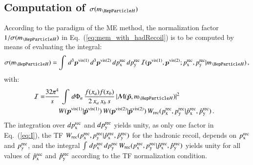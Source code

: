 \subsection{Computation of $\sigma(m_{\PHiggs})$}
\label{sec:mem_xSection}

According to the paradigm of the ME method, the normalization factor
$1/\sigma(m_{\PHiggs})$ in Eq.~(\ref{eq:mem_with_hadRecoil}) is to be computed
by means of evaluating the integral:
\begin{equation}
\sigma(m_{\PHiggs}) =
\int \, d^{3}\bm{p}^{\vis(1)} \, d^{3}\bm{p}^{\vis(2)} \,
d\pX^{\rec} \, d\pY^{\rec} \, \mathcal{I}(\bm{p}^{\vis(1)},\bm{p}^{\vis(2)};\pX^{\rec},\pY^{\rec}|m_{\PHiggs}) \, ,
\label{eq:xSection}
\end{equation}
with:
\begin{align}
\mathcal{I} = & \frac{32\pi^{4}}{s} \, \int \, d\Phi_{n} \,
\frac{f(x_{a}) f(x_{b})}{2 \, x_{a} \, x_{b} \, s} \, \vert \mathcal{M}(\tilde{\bm{p}},m_{\PHiggs}) \vert^{2} \, \hspace{2cm} \nonumber \\
& \qquad W(\bm{p}^{\vis(1)}|\hat{\bm{p}}^{\vis(1)}) \, W(\bm{p}^{\vis(2)}|\hat{\bm{p}}^{\vis(2)}) \, W_{\rec}( \pX^{\rec},\pY^{\rec} | \pXhat^{\rec},\pYhat^{\rec} ) \, .
\label{eq:I}
\end{align}
The integration over $dp_{\textrm{x}}^{\textrm{rec}}$ and $dp_{\textrm{y}}^{\textrm{rec}}$ yields unity,
as only one factor in Eq.~(\ref{eq:I}), the TF $W_{\textrm{rec}}( p_{\textrm{x}}^{\textrm{rec}},p_{\textrm{y}}^{\textrm{rec}} | \hat{p}_{\textrm{x}}^{\textrm{rec}},\hat{p}_{\textrm{y}}^{\textrm{rec}} )$ for the hadronic recoil,
depends on $p_{\textrm{x}}^{\textrm{rec}}$ and $p_{\textrm{y}}^{\textrm{rec}}$,
and the integral $\int \, dp_{\textrm{x}}^{\textrm{rec}} \, dp_{\textrm{y}}^{\textrm{rec}} \, W_{\textrm{rec}}(
p_{\textrm{x}}^{\textrm{rec}}, p_{\textrm{y}}^{\textrm{rec}} | \hat{p}_{\textrm{x}}^{\textrm{rec}}, \hat{p}_{\textrm{y}}^{\textrm{rec}} )$ yields unity for all values of $\hat{p}_{\textrm{x}}^{\textrm{rec}}$ and $\hat{p}_{\textrm{y}}^{\textrm{rec}}$
according to the TF normalization condition.

